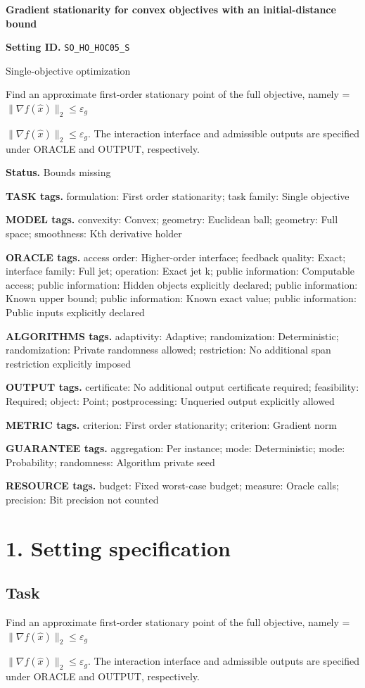 \documentclass[10pt,a4paper]{article}
\newcommand{\AtlasMath}[1]{\par\begingroup\centering\setbox0=\hbox{$\displaystyle #1$}\ifdim\wd0>1.4\linewidth\typeout{ATLAS WIDE FORMULA: \the\wd0}\fi\ifdim\wd0>\linewidth\resizebox{\linewidth}{!}{\box0}\else\box0\fi\par\endgroup}
\newcommand{\AtlasInlineMath}[1]{\begingroup\setbox0=\hbox{$#1$}\ifdim\wd0>.4\linewidth\endgroup\AtlasMath{#1}\else\endgroup$#1$\fi}
\begin{document}
\raggedright

{\LARGE\bfseries\sffamily\color{AtlasNavy} Gradient stationarity for convex objectives with an initial-distance bound\par}\vspace{5pt}
\textbf{Setting ID.} \texttt{SO\_\allowbreak{}HO\_\allowbreak{}HOC05\_\allowbreak{}S}

Single-objective optimization

Find an approximate first-order stationary point of the full objective, namely \AtlasInlineMath{\|\nabla f(\widehat{x})\|_2\le\varepsilon_g}. The interaction interface and admissible outputs are specified under ORACLE and OUTPUT, respectively.

\textbf{Status.} Bounds missing

\textbf{TASK tags.} formulation: First order stationarity; task family: Single objective

\textbf{MODEL tags.} convexity: Convex; geometry: Euclidean ball; geometry: Full space; smoothness: Kth derivative holder

\textbf{ORACLE tags.} access order: Higher-order interface; feedback quality: Exact; interface family: Full jet; operation: Exact jet k; public information: Computable access; public information: Hidden objects explicitly declared; public information: Known upper bound; public information: Known exact value; public information: Public inputs explicitly declared

\textbf{ALGORITHMS tags.} adaptivity: Adaptive; randomization: Deterministic; randomization: Private randomness allowed; restriction: No additional span restriction explicitly imposed

\textbf{OUTPUT tags.} certificate: No additional output certificate required; feasibility: Required; object: Point; postprocessing: Unqueried output explicitly allowed

\textbf{METRIC tags.} criterion: First order stationarity; criterion: Gradient norm

\textbf{GUARANTEE tags.} aggregation: Per instance; mode: Deterministic; mode: Probability; randomness: Algorithm private seed

\textbf{RESOURCE tags.} budget: Fixed worst-case budget; measure: Oracle calls; precision: Bit precision not counted

\section{1. Setting specification}
\subsection{Task}
Find an approximate first-order stationary point of the full objective, namely \AtlasInlineMath{\|\nabla f(\widehat{x})\|_2\le\varepsilon_g}. The interaction interface and admissible outputs are specified under ORACLE and OUTPUT, respectively.
\end{document}
